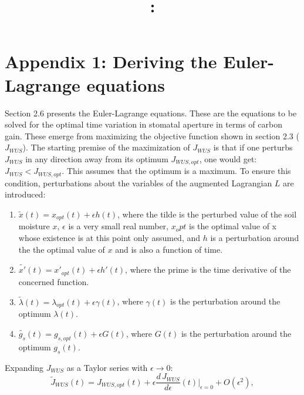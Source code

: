\documentclass[utf8]{frontiers_suppmat} %
\begin{document}
\onecolumn
{}

\title[Appendix]{{}:
\\ } %


\maketitle


\section*{Appendix 1: Deriving the Euler-Lagrange equations}

Section 2.6 presents the Euler-Lagrange equations. These are the equations to be solved for the optimal time variation in stomatal aperture in terms of carbon gain. These emerge from maximizing the objective function shown in section 2.3 ($J_{WUS}$). The starting premise of the maximization of $J_{WUS}$ is that if one perturbs $J_{WUS}$ in any direction away from its optimum $J_{WUS,opt}$, one would get: $J_{WUS} < J_{WUS,opt}$. This assumes that the optimum is a maximum. To ensure this condition, perturbations about the variables of the augmented Lagrangian $L$ are introduced:
\begin{enumerate}
    \item $\widetilde{x}(t) = x_{opt}(t) + \epsilon h(t)$, where the tilde is the perturbed value of the soil moisture $x$, $\epsilon$ is a very small real number, $x_opt$ is the optimal value of x whose existence is at this point only assumed, and $h$ is a perturbation around the the optimal value of $x$ and is also a function of time.
    \item $\widetilde{x'}(t) = x'_{opt}(t) + \epsilon h'(t)$, where the prime is the time derivative of the concerned function.
    \item $\widetilde{\lambda}(t) = \lambda_{opt}(t) + \epsilon \gamma(t)$, where $\gamma(t)$ is the perturbation around the optimum $\lambda(t)$.
    \item $\widetilde{g_s}(t) = g_{s,opt}(t) + \epsilon G(t)$, where $G(t)$ is the perturbation around the optimum $g_s(t)$.
\end{enumerate}
Expanding $J_{WUS}$ as a Taylor series with $\epsilon \rightarrow 0$:
\begin{equation}
    \label{eqn:objective_taylor}
    \widetilde{J}_{WUS}(t) = J_{WUS,opt}(t) + \epsilon \frac{d\, J_{WUS}}{d \epsilon}(t) |_{\epsilon = 0} + O(\epsilon^2),
\end{equation}
\end{document}
